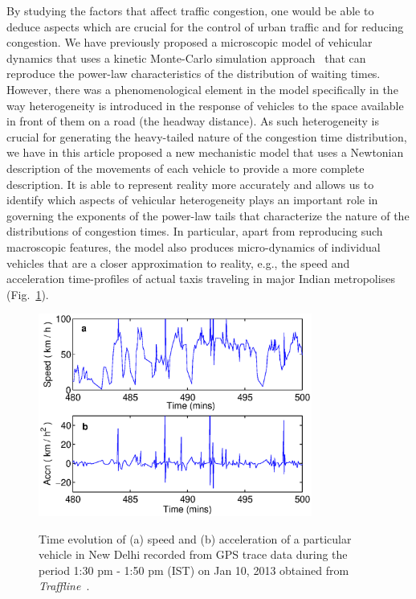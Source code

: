 \documentclass[conference]{IEEEtran}
\begin{document}
By studying the factors that affect traffic congestion, one
would be able to deduce aspects which are crucial for the control of
urban traffic and for reducing congestion.
We have previously proposed a microscopic model of vehicular dynamics
that uses a kinetic Monte-Carlo simulation approach~\cite{Majith2016}
that can reproduce the power-law characteristics of the distribution
of waiting times. However, there was a phenomenological element in the
model specifically in the way heterogeneity is introduced in the
response of vehicles to the space available in front of them on a road
(the headway distance). As such heterogeneity is crucial for
generating the heavy-tailed nature of the congestion time
distribution, we have in this article proposed a new mechanistic model
that uses a Newtonian description of the movements of each vehicle to
provide a more complete description. It is able to represent reality
more accurately and allows us to identify which aspects of vehicular
heterogeneity plays an important role in governing the exponents of the
power-law tails that characterize the nature of the distributions of
congestion times. In particular, apart from reproducing such macroscopic
features, the model also produces micro-dynamics of individual
vehicles that are a closer approximation to reality, e.g., the speed
and acceleration time-profiles of actual taxis traveling in major
Indian metropolises (Fig.~\ref{taxi_acc}).

\begin{figure}
{    \includegraphics[width=9.0cm, angle=0]{figures/fig1.eps}}
\caption{Time evolution of (a) speed and (b) acceleration of a
particular vehicle in New Delhi recorded from GPS trace data during 
the period 1:30 pm - 1:50 pm (IST) on Jan 10, 2013 obtained from {\em
Traffline}~\cite{traffline}.}
    \label{taxi_acc}
\end{figure}
\end{document}
